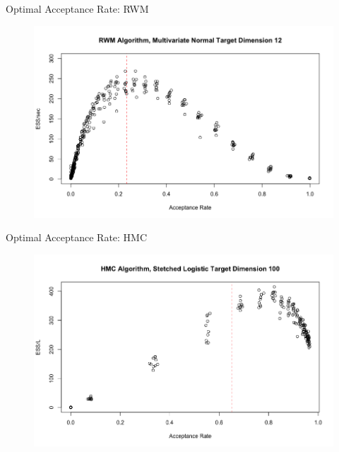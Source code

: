 \documentclass{beamer}
\begin{document}
\begin{frame}{Optimal Acceptance Rate: RWM}
\begin{figure}
\centering
\includegraphics[scale = 0.3]{RWM_Optimal12.png}
\end{figure}
\end{frame}


\begin{frame}{Optimal Acceptance Rate: HMC}

\begin{figure}
\centering
\includegraphics[scale = 0.3]{HMC_Optimal100.png}
\end{figure}

\end{frame}

\end{document}
